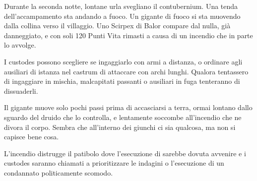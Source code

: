 \documentclass[11.5pt,twocolumn]{article}
\newcommand\geordie{Georgius Mar Mathan}
\begin{document}
Durante la seconda notte, lontane urla svegliano il contubernium.
Una tenda dell'accampamento sta andando a fuoco.
Un gigante di fuoco si sta muovendo dalla collina verso il villaggio.
Uno Scirpex di Balor compare dal nulla, gi\`{a} danneggiato, e con soli 120 Punti Vita rimasti a causa di un incendio che in parte lo avvolge.


I custodes possono scegliere se ingaggiarlo con armi a distanza, o ordinare agli ausiliari di istanza nel castrum di attaccare con archi lunghi.
Qualora tentassero di ingaggiare in mischia, malcapitati passanti o ausiliari in fuga tenteranno di dissuaderli.

Il gigante muove solo pochi passi prima di accasciarsi a terra, ormai lontano dallo sguardo del druido che lo controlla, e lentamente soccombe all'incendio che ne divora il corpo.
Sembra che all'interno dei giunchi ci sia qualcosa, ma non si capisce bene cosa.

L'incendio distrugge il patibolo dove l'esecuzione di \npcref{\geordie} sarebbe dovuta avvenire e i custodes saranno chiamati a prioritizzare le indagini o l'esecuzione di un condannato politicamente scomodo.
\end{document}
